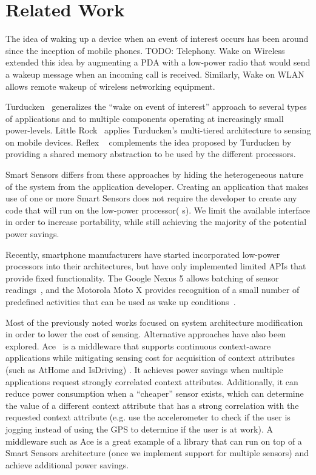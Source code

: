 \section{Related Work}\label{sec:related}

The idea of waking up a device when an event of interest occurs has been 
around since the inception of mobile phones. TODO: Telephony. Wake on 
Wireless~\cite{shih2002wake} extended this idea by augmenting a PDA with 
a low-power radio that would send a wakeup message when an incoming call 
is received. Similarly, Wake on WLAN~\cite{mishra2006wake} allows remote 
wakeup of wireless networking equipment.

Turducken~\cite{turducken} generalizes the ``wake on event of interest'' 
approach to several types of applications and to multiple components 
operating at increasingly small power-levels. Little Rock~\cite{littlerock} 
applies Turducken's multi-tiered architecture to sensing on mobile 
devices. Reflex ~\cite{reflex} complements the idea proposed by Turducken 
by providing a shared memory abstraction to be used by the different 
processors.

Smart Sensors differs from these approaches by hiding the heterogeneous 
nature of the system from the application developer. Creating an 
application that makes use of one or more Smart Sensors does not require 
the developer to create any code that will run on the low-power processor(
s). We limit the available interface in order to increase portability, 
while still achieving the majority of the potential power savings.

Recently, smartphone manufacturers have started incorporated low-power 
processors into their architectures, but have only implemented limited 
APIs that provide fixed functionality. The Google Nexus 5 allows batching 
of sensor readings~\cite{ android4.4,nexus5}, and the Motorola Moto X 
provides recognition of a small number of predefined activities that can 
be used as wake up conditions~\cite{motox}.

Most of the previously noted works focused on system architecture 
modification in order to lower the cost of sensing. Alternative 
approaches have also been explored. Ace~\cite{ace} is a middleware that 
supports continuous context-aware applications while mitigating sensing 
cost for acquisition of context attributes (such as AtHome and IsDriving)
. It achieves power savings when multiple applications request strongly 
correlated context attributes. Additionally, it can reduce power 
consumption when a ``cheaper'' sensor exists, which can determine the 
value of a different context attribute that has a strong correlation with 
the requested context attribute (e.g. use the accelerometer to check if 
the user is jogging instead of using the GPS to determine if the user is 
at work). A middleware such as Ace is a great example of a library that 
can run on top of a Smart Sensors architecture (once we implement support 
for multiple sensors) and achieve additional power savings.

